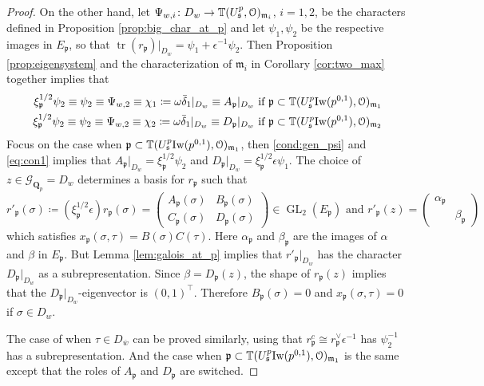 \documentclass[leqno]{amsart}
\theoremstyle{definition}
\theoremstyle{remark}
\newcommand{\eo}{\EuScript{O}}
\newcommand{\Qp}{\mathbf{Q}_p}
\DeclareMathOperator{\GL}{GL}
\DeclareMathOperator{\mtr}{tr}
\newcommand{\fm}{\mathfrak{m}}
\newcommand{\fp}{\mathfrak{p}}
\newcommand{\fs}{\mathfrak{s}}
\newcommand{\Gp}{\mathcal{G}_{\Qp}} %
\newcommand{\bw}{{\overline{w}}}
\newcommand{\Iw}{\textnormal{Iw}} %
\newcommand{\TT}{\mathbb{T}} %
\begin{document}
\begin{proof}
On the other hand, 
let $\Psi_{w,i}\colon D_{w}\to \TT(U^p_\fs,\eo)_{\fm_i}$,
$i=1,2$, be the characters defined in Proposition 
\ref{prop:big_char_at_p}
and let $\psi_{1},\psi_2$ be the respective images in $E_\fp$,
so that $\mtr(r_\fp)\vert_{D_{w}}=\psi_1+\epsilon^{-1}\psi_2$.
Then Proposition \ref{prop:eigensystem}
and the characterization of $\fm_i$ in 
Corollary \ref{cor:two_max} together implies that
\begin{align}
\xi_\fp^{1/2}\psi_2\equiv\psi_2
\equiv\Psi_{w,2}\equiv 
\chi_1\coloneqq 
\omega\bar{\delta}_1\vert_{D_{w}}\equiv A_\fp\vert_{D_{w}}
\text{ if }
\fp\subset \TT(U^p_\fs\Iw(p^{0,1}),\eo)_{\fm_1}
\label{eq:con1}\\
\xi_\fp^{1/2}\psi_2\equiv\psi_2
\equiv\Psi_{w,2}\equiv 
\chi_2\coloneqq 
\omega\bar{\delta}_1\vert_{D_{w}}\equiv D_\fp\vert_{D_{w}}
\text{ if }
\fp\subset \TT(U^p_\fs\Iw(p^{0,1}),\eo)_{\fm_2}
\end{align}
Focus on the case when
$\fp\subset \TT(U^p_\fs\Iw(p^{0,1}),\eo)_{\fm_1}$,
then \eqref{cond:gen_psi} and \eqref{eq:con1}
implies that 
$A_\fp\vert_{D_{w}}=\xi_\fp^{1/2}\psi_2$ and
$D_\fp\vert_{D_{w}}=\xi_\fp^{1/2}\epsilon\psi_1$.
The choice of $z\in\Gp=D_w$
determines a basis for $r_\fp$ such that
\[
    r'_\fp(\sigma)\coloneqq
    (\xi_\fp^{1/2}\epsilon)r_\fp(\sigma)=
    \begin{pmatrix}
        A_\fp(\sigma) & B_\fp(\sigma)\\
        C_\fp(\sigma) & D_\fp(\sigma)
    \end{pmatrix}
    \in \GL_2(E_\fp) \text{ and }
    r'_\fp(z)=
    \begin{pmatrix}
        \alpha_\fp & \\
        & \beta_\fp
    \end{pmatrix}
\]
which satisfies $x_\fp(\sigma,\tau)=B(\sigma)C(\tau)$.
Here $\alpha_\fp$ and $\beta_\fp$
are the images of $\alpha$ and $\beta$ in $E_\fp$.
But Lemma \ref{lem:galois_at_p}
implies that $r'_\fp\vert_{D_{w}}$
has the character $D_\fp\vert_{D_{w}}$
as a subrepresentation.
Since $\beta=D_\fp(z)$,
the shape of $r_\fp(z)$ implies that
the $D_\fp\vert_{D_w}$-eigenvector
is $(0,1)^\intercal$.
Therefore $B_\fp(\sigma)=0$
and $x_\fp(\sigma,\tau)=0$
if $\sigma\in D_w$.


The case of when $\tau\in D_{\bw}$
can be proved similarly,
using that $r_\fp^c\cong r_\fp^\vee\epsilon^{-1}$
has $\psi_2^{-1}$ has a subrepresentation.
And the case when 
$\fp\subset \TT(U^p_\fs\Iw(p^{0,1}),\eo)_{\fm_1}$
is the same except that the roles
of $A_\fp$ and $D_\fp$ are switched.

\end{proof}
\end{document}

